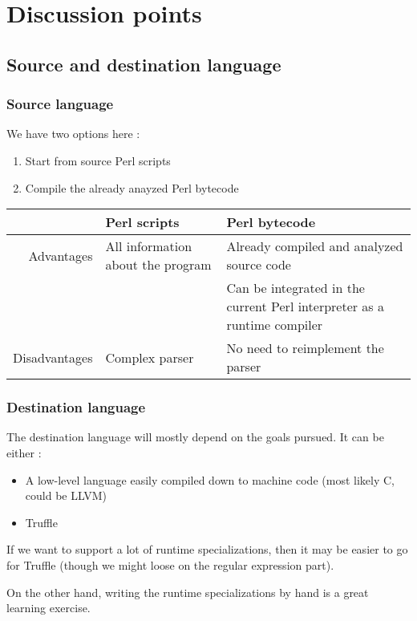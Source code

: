 \documentclass[11pt,a4paper]{report}
\newcommand{\pgl}[1]{\textsf{#1}}
\begin{document}
\chapter{Discussion points}

\section{Source and destination language}

\subsection{Source language}

We have two options here :
\begin{enumerate}
\item Start from source Perl scripts
\item Compile the already anayzed Perl bytecode
\end{enumerate}

\begin{tabular}{|r|l|l|}
\hline
	& Perl scripts	& Perl bytecode \\
\hline
Advantages	& All information about the program	& Already compiled and analyzed source code \\
	&	& Can be integrated in the current Perl interpreter as a runtime compiler \\
\hline
Disadvantages	& Complex parser	& No need to reimplement the parser \\
\hline
\end{tabular}

\subsection{Destination language}

The destination language will mostly depend on the goals pursued. It can be either :
\begin{itemize}
\item A low-level language easily compiled down to machine code (most likely \pgl{C}, could be \pgl{LLVM})
\item Truffle
\end{itemize}

If we want to support a lot of runtime specializations, then it may be easier to go for Truffle (though we might loose on the regular expression part).

On the other hand, writing the runtime specializations by hand is a great learning exercise.
\end{document}
